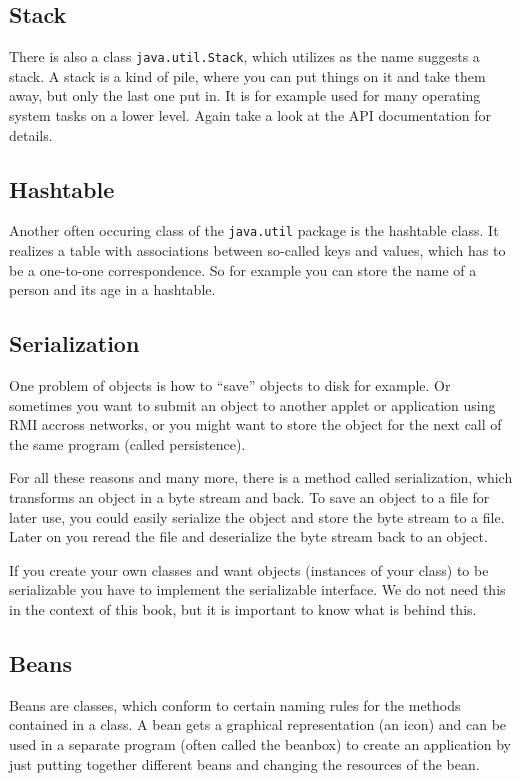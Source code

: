 \subsection{Stack}
There is also a class \verb|java.util.Stack|, which utilizes as the
name suggests a stack. A stack is a kind of pile, where you can put
things on it and take them away, but only the last one put in. It is
for example used for many operating system tasks on a lower level.
Again take a look at the API documentation for details.

\subsection{Hashtable}
Another often occuring class of the \verb|java.util| package is the
hashtable class. It realizes a table with associations between so-called
keys and values, which has to be a one-to-one correspondence. So for
example you can store the name of a person and its age in a hashtable.


\subsection{Serialization}
One problem of objects is how to ``save'' objects to disk for example.
Or sometimes you want to submit an object to another applet or
application using RMI accross networks, or you might want to
store the object for the next call of the same program (called 
persistence). 

For all
these reasons and many more, there is a method called serialization,
which transforms an object in a byte stream and back. 
To save an object to a file for later use, you could easily serialize
the object and store the byte stream to a file. Later on you reread
the file and deserialize the byte stream back to an object. 

If you create your own classes and want objects (instances of your 
class) to be serializable you have to implement the serializable interface.
We do not need this in the context of this book, but it is
important to know what is behind this.  

\subsection{Beans}
\label{sec:Beans}
Beans are classes, which conform to certain naming rules
for the methods contained in a class. A bean gets a graphical
representation (an icon) and can be used in a separate program
(often called the beanbox) to create an application by just
putting together different beans and changing the resources
of the bean. 

